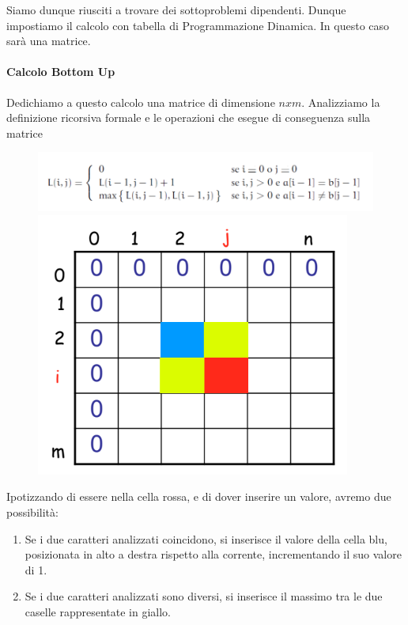 \documentclass{article}
\begin{document}
Siamo dunque riusciti a trovare dei sottoproblemi dipendenti. Dunque impostiamo il calcolo con tabella di Programmazione Dinamica. In questo caso sarà una matrice.

\newpage

\paragraph{Calcolo Bottom Up}

Dedichiamo a questo calcolo una matrice di dimensione $nxm$. Analizziamo la definizione ricorsiva formale e le operazioni che esegue di conseguenza sulla matrice

\begin{figure}[htbp]
        \center
        \includegraphics[scale=0.45]{img/LCS2.png}
        \includegraphics[scale=0.45]{img/LCS3.png}
\end{figure}

Ipotizzando di essere nella cella rossa, e di dover inserire un valore, avremo due possibilità:

\begin{enumerate}
    \item Se i due caratteri analizzati coincidono, si inserisce il valore della cella blu, posizionata in alto a destra rispetto alla corrente, incrementando il suo valore di 1.
    \item Se i due caratteri analizzati sono diversi, si inserisce il massimo tra le due caselle rappresentate in giallo.
\end{enumerate}
\end{document}
